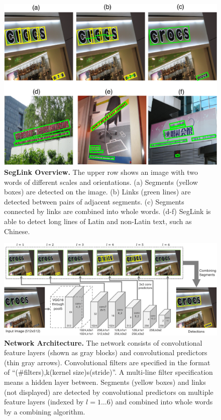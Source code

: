 \documentclass[10pt,twocolumn,letterpaper]{article}
\begin{document}
\begin{figure}[t]
  \centering
  \includegraphics[width=\linewidth]{figures/seg-link.pdf}
  \caption{\textbf{SegLink Overview.} The upper row shows an image with two words of different scales and orientations. (a) Segments (yellow boxes) are detected on the image. (b) Links (green lines) are detected between pairs of adjacent segments. (c) Segments connected by links are combined into whole words. (d-f) SegLink is able to detect long lines of Latin and non-Latin text, such as Chinese.}
  \label{fig:seg-link}
\end{figure}

\begin{figure}[t]
  \centering
  \includegraphics[width=0.85\linewidth]{figures/model-overview.pdf}
  \caption{\textbf{Network Architecture.} The network consists of convolutional feature layers (shown as gray blocks) and convolutional predictors (thin gray arrows). Convolutional filters are specified in the format of ``(\#filters),k(kernel size)s(stride)''. A multi-line filter specification means a hidden layer between. Segments (yellow boxes) and links (not displayed) are detected by convolutional predictors on multiple feature layers (indexed by $l=1\dots6$) and combined into whole words by a combining algorithm.}
  \label{fig:model-overview}
\end{figure}
\end{document}
